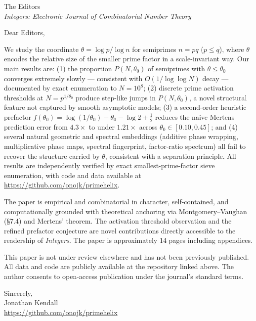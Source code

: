 \documentclass[11pt]{article}
\begin{document}
\noindent The Editors\\
\textit{Integers: Electronic Journal of Combinatorial Number Theory}

\bigskip

Dear Editors,

We study the coordinate \(\theta = \log p / \log n\) for semiprimes \(n = pq\)
(\(p \leq q\)), where \(\theta\) encodes the relative size of the smaller prime
factor in a scale-invariant way.  Our main results are: (1) the proportion
\(P(N, \theta_0)\) of semiprimes with \(\theta \leq \theta_0\) converges
extremely slowly --- consistent with \(O(1/\!\log\log N)\) decay --- documented
by exact enumeration to \(N = 10^8\); (2) discrete prime activation thresholds
at \(N = p^{1/\theta_0}\) produce step-like jumps in \(P(N, \theta_0)\), a
novel structural feature not captured by smooth asymptotic models; (3) a
second-order heuristic prefactor \(f(\theta_0) = \log(1/\theta_0) - \theta_0 -
\log 2 + \tfrac{1}{2}\) reduces the naive Mertens prediction error from
\(4.3\times\) to under \(1.21\times\) across \(\theta_0 \in [0.10, 0.45]\);
and (4) several natural geometric and spectral embeddings (additive phase
wrapping, multiplicative phase maps, spectral fingerprint, factor-ratio
spectrum) all fail to recover the structure carried by \(\theta\), consistent
with a separation principle.  All results are independently verified by exact
smallest-prime-factor sieve enumeration, with code and data available at
\url{https://github.com/onojk/primehelix}.

The paper is empirical and combinatorial in character, self-contained, and
computationally grounded with theoretical anchoring via Montgomery--Vaughan
(\S7.4) and Mertens' theorem.  The activation threshold observation and the
refined prefactor conjecture are novel contributions directly accessible to the
readership of \textit{Integers}.  The paper is approximately 14 pages including
appendices.

This paper is not under review elsewhere and has not been previously published.
All data and code are publicly available at the repository linked above.  The
author consents to open-access publication under the journal's standard terms.

\bigskip
\noindent Sincerely,\\[4pt]
Jonathan Kendall\\
\url{https://github.com/onojk/primehelix}
\end{document}
